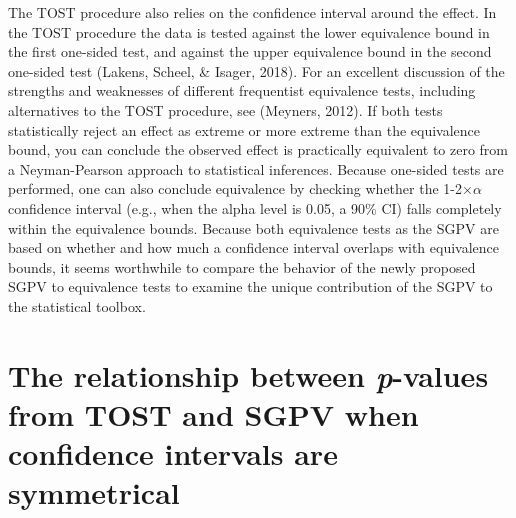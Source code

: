 \documentclass[,man,floatsintext]{apa6}
\begin{document}
The TOST procedure also relies on the confidence interval around the
effect. In the TOST procedure the data is tested against the lower
equivalence bound in the first one-sided test, and against the upper
equivalence bound in the second one-sided test (Lakens, Scheel, \&
Isager, 2018). For an excellent discussion of the strengths and
weaknesses of different frequentist equivalence tests, including
alternatives to the TOST procedure, see (Meyners, 2012). If both tests
statistically reject an effect as extreme or more extreme than the
equivalence bound, you can conclude the observed effect is practically
equivalent to zero from a Neyman-Pearson approach to statistical
inferences. Because one-sided tests are performed, one can also conclude
equivalence by checking whether the 1-2\(\times\)\(\alpha\) confidence
interval (e.g., when the alpha level is 0.05, a 90\% CI) falls
completely within the equivalence bounds. Because both equivalence tests
as the SGPV are based on whether and how much a confidence interval
overlaps with equivalence bounds, it seems worthwhile to compare the
behavior of the newly proposed SGPV to equivalence tests to examine the
unique contribution of the SGPV to the statistical toolbox.

\section{\texorpdfstring{The relationship between \emph{p}-values from
TOST and SGPV when confidence intervals are
symmetrical}{The relationship between p-values from TOST and SGPV when confidence intervals are symmetrical}}\label{the-relationship-between-p-values-from-tost-and-sgpv-when-confidence-intervals-are-symmetrical}
\end{document}
